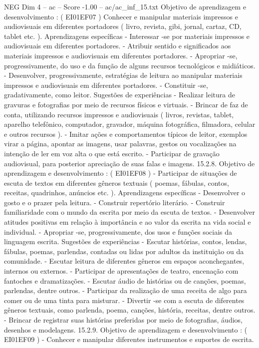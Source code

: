 \begin{textsample}{NEG Dim 4 – ac – Score -1.00 – ac/ac\_inf\_15.txt}
Objetivo de aprendizagem e desenvolvimento : ( EI01EF07 ) Conhecer e manipular materiais impressos e audiovisuais em diferentes portadores ( livro, revista, gibi, jornal, cartaz, CD, tablet etc. ).
Aprendizagens específicas - Interessar -se por materiais impressos e audiovisuais em diferentes portadores. - Atribuir sentido e significados aos materiais impressos e audiovisuais em diferentes portadores. - Apropriar -se, progressivamente, do uso e da função de alguns recursos tecnológicos e midiáticos. - Desenvolver, progressivamente, estratégias de leitura ao manipular materiais impressos e audiovisuais em diferentes portadores. - Constituir -se, gradativamente, como leitor.
Sugestões de experiências - Realizar leitura de gravuras e fotografias por meio de recursos físicos e virtuais. - Brincar de faz de conta, utilizando recursos impressos e audiovisuais ( livros, revistas, tablet, aparelho telefônico, computador, gravador, máquina fotográfica, filmadora, celular e outros recursos ). - Imitar ações e comportamentos típicos de leitor, exemplos virar a página, apontar as imagens, usar palavras, gestos ou vocalizações na intenção de ler em voz alta o que está escrito. - Participar de gravação audiovisual, para posterior apreciação de suas falas e imagens. 15.2.8.
Objetivo de aprendizagem e desenvolvimento : ( EI01EF08 ) - Participar de situações de escuta de textos em diferentes gêneros textuais ( poemas, fábulas, contos, receitas, quadrinhos, anúncios etc. ).
Aprendizagens específicas - Desenvolver o gosto e o prazer pela leitura. - Construir repertório literário. - Construir familiaridade com o mundo da escrita por meio da escuta de textos. - Desenvolver atitudes positivas em relação à importância e ao valor da escrita na vida social e individual. - Apropriar -se, progressivamente, dos usos e funções sociais da linguagem escrita.
Sugestões de experiências - Escutar histórias, contos, lendas, fábulas, poemas, parlendas, contadas ou lidas por adultos da instituição ou da comunidade. - Escutar leitura de diferentes gêneros em espaços aconchegantes, internos ou externos. - Participar de apresentações de teatro, encenação com fantoches e dramatizações. - Escutar áudio de histórias ou de canções, poemas, parlendas, dentre outros. - Participar da realização de uma receita de algo para comer ou de uma tinta para misturar. - Divertir -se com a escuta de diferentes gêneros textuais, como parlenda, poema, canções, história, receitas, dentre outros. - Brincar de registrar suas histórias preferidas por meio de fotografias, áudios, desenhos e modelagens. 15.2.9.
Objetivo de aprendizagem e desenvolvimento : ( EI01EF09 ) - Conhecer e manipular diferentes instrumentos e suportes de escrita.

\end{textsample}
